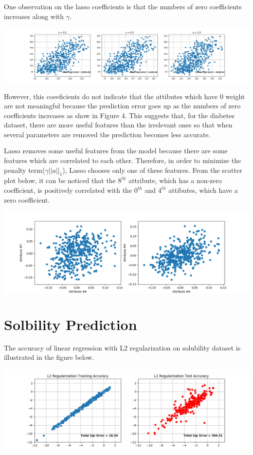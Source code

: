 \documentclass{article}
\begin{document}
One observation on the lasso coefficients is that the numbers of zero coefficients increases along with $\gamma$.

\begin{center}
\includegraphics[scale=0.3]{lasso_error_compare}
\end{center}

\indent However, this coeeficients do not indicate that the attibutes which have 0 weight are not meaningful because the prediction error goes up as the numbers of zero coefficients increases as show in Figure 4. This suggests that, for the diabetes dataset, there are more useful features than the irrelevant ones so that when several parameters are removed the prediction becomes less accurate.

Lasso removes some useful features from the model because there are some features which are correlated to each other. Therefore, in order to minimize the penalty term($\gamma||a||_1$), Lasso chooses only one of these features. From the scatter plot below, it can be noticed that the $8^{th}$ attribute, which has a non-zero coefficient, is positively correlated with the $0^{th}$ and $4^{th}$ attibutes, which have a zero coefficient.
\begin{center}
\includegraphics[scale=0.3]{correlation}
\end{center}

\section{Solbility Prediction}

The accuracy of linear regression with L2 regularization on solubility dataset is illustrated in the figure below.
\begin{center}
\includegraphics[scale=0.3]{tikhanov_solubility_acc} \\
\end{center}
\end{document}
